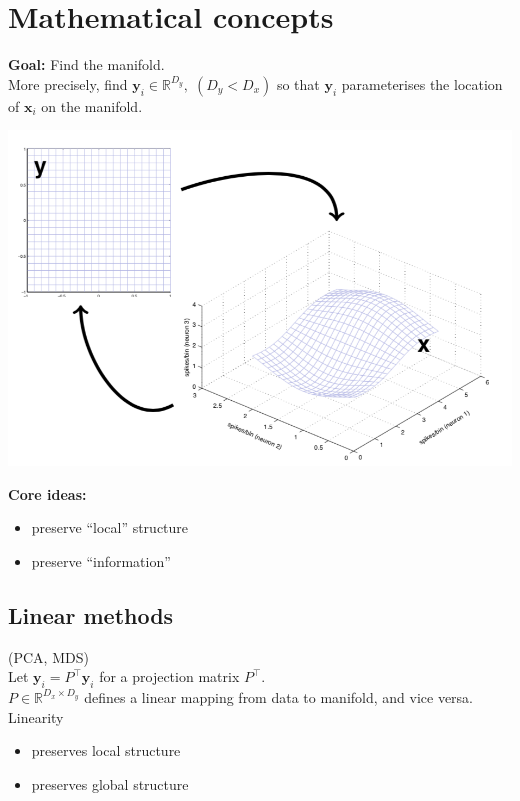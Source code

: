 \documentclass[11pt]{article}
\begin{document}
\section{Mathematical concepts}

\textbf{Goal:} Find the manifold.\\

More precisely, find $\mathbf{y}_i \in \mathbb{R}^{D_y} ,\; (D_y < D_x)$ so that $\mathbf{y}_i$ parameterises the location of $\mathbf{x}_i$ on the manifold.

\begin{center}
\includegraphics[width=0.7\linewidth]{dimred_manifold_embed}	
\end{center}


\textbf{Core ideas:}
    \begin{itemize}
    \item preserve ``local'' structure
    \item preserve ``information''
    \end{itemize}

\subsection{Linear methods}
(PCA, MDS)
\\

Let $\mathbf{y}_i = P^\top \mathbf{y}_i$ for a projection matrix $P^\top$.\\[1ex]

$P \in \mathbb{R}^{D_x\times D_y}$ defines a linear mapping from data to manifold, and vice versa.  \\[1ex]


Linearity
\begin{itemize}
\item preserves local structure  
\item preserves global structure
\end{itemize}
\end{document}
